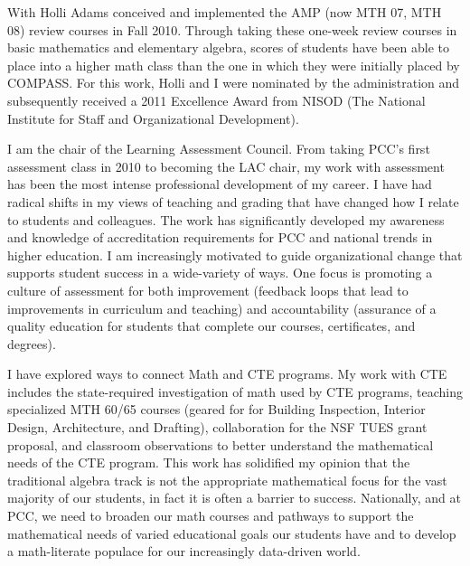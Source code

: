 \begin{description}[style=nextline]
	\item[Michael Marciniak, (Faculty Chair, Cascade Campus)]
	With Holli Adams conceived and implemented the AMP (now MTH 07, MTH 08) review
	courses in Fall 2010.  Through taking these one-week review courses in basic
	mathematics and elementary algebra, scores of students have been able to place
	into a higher math class than the one in which they were initially placed by
	COMPASS.   For this work, Holli and I were nominated by the administration and
	subsequently received a 2011 Excellence Award from NISOD (The National
	Institute for Staff and Organizational Development).

	\item[Michele Marden (Full-time Instructor, Sylvania Campus)]
	I am the chair of the Learning Assessment Council.  From taking PCC's first
	assessment class in 2010 to becoming the LAC chair, my work with assessment has
	been the most intense professional development of my career. I have had radical
	shifts in my views of teaching and grading that have changed how I relate to
	students and colleagues. The work has significantly developed my awareness and
	knowledge of accreditation requirements for PCC and national trends in higher
	education. I am increasingly motivated to guide organizational change that
	supports student success in a wide-variety of ways. One focus is promoting a
	culture of assessment for both improvement (feedback loops that lead to
	improvements in curriculum and teaching) and accountability (assurance of a
	quality education for students that complete our courses, certificates, and
	degrees).

	I have explored ways to connect Math and CTE programs.  My work with CTE
	includes the state-required investigation of math used by CTE programs,
	teaching specialized MTH 60/65 courses (geared for for Building Inspection,
	Interior Design, Architecture, and Drafting), collaboration for the NSF TUES
	grant proposal, and classroom observations to better understand the
	mathematical needs of the CTE program. This work has solidified my opinion that
	the traditional algebra track is not the appropriate mathematical focus for the
	vast majority of our students, in fact it is often a barrier to success.
	Nationally, and at PCC, we need to broaden our math courses and pathways to
	support the mathematical needs of varied educational goals our students have
	and to develop a math-literate populace for our increasingly data-driven world.


\end{description}

